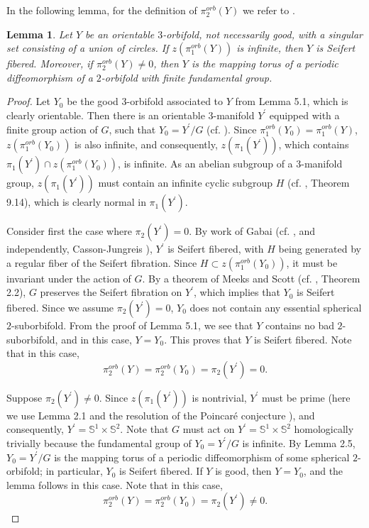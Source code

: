 \documentclass[11pt]{amsart}
\theoremstyle{plain}
\numberwithin{theorem}{section}
\newtheorem{lemma}[theorem]{Lemma}
\theoremstyle{definition}
\begin{document}
In the following lemma, for the definition of $\pi_2^{orb}(Y)$ we refer to \cite{Hae1, Hae2, C0}.

\begin{lemma}
Let $Y$ be an orientable $3$-orbifold, not necessarily good, with a singular set
consisting of a union of circles. If $z(\pi_1^{orb}(Y))$ is infinite, then $Y$ is Seifert fibered.
Moreover, if $\pi_2^{orb}(Y)\neq 0$, then $Y$ is the mapping torus of a periodic diffeomorphism 
of a $2$-orbifold with finite fundamental group.
\end{lemma}

\begin{proof}
Let $Y_0$ be the good $3$-orbifold associated to $Y$ from Lemma 5.1, which is clearly
orientable. Then there is an orientable $3$-manifold $Y^\prime$ equipped with a finite group action 
of $G$, such that $Y_0=Y^\prime/G$ (cf. \cite{BLP, MM}). Since $\pi_1^{orb}(Y_0)=\pi_1^{orb}(Y)$, 
$z(\pi_1^{orb}(Y_0))$ is also infinite, and consequently, $z(\pi_1(Y^\prime))$,
which contains $\pi_1(Y^\prime)\cap z(\pi_1^{orb}(Y_0))$, is infinite. 
As an abelian subgroup of a $3$-manifold group, $z(\pi_1(Y^\prime))$ must contain 
an infinite cyclic subgroup $H$ (cf. \cite{Hem}, Theorem 9.14), which is clearly normal 
in $\pi_1(Y^\prime)$. 

Consider first the case where $\pi_2(Y^\prime)=0$. By work of Gabai (cf. \cite{Gabai}, and independently, Casson-Jungreis \cite{CJ}), $Y^\prime$ is Seifert fibered, with $H$ 
being generated by a regular fiber of the Seifert fibration. Since $H\subset z(\pi_1^{orb}(Y_0))$, 
it must be invariant under the action of $G$. By a theorem of Meeks and Scott (cf. \cite{MS}, 
Theorem 2.2), $G$ preserves the Seifert fibration on $Y^\prime$, which implies
that $Y_0$ is Seifert fibered. Since we assume $\pi_2(Y^\prime)=0$, $Y_0$ does not contain
any essential spherical $2$-suborbifold. From the proof of Lemma 5.1, we see that $Y$ contains
no bad $2$-suborbifold, and in this case, $Y=Y_0$. This proves that $Y$ is Seifert fibered.
Note that in this case, 
$$
\pi_2^{orb}(Y)=\pi_2^{orb}(Y_0)=\pi_2(Y^\prime)=0.
$$

Suppose $\pi_2(Y^\prime)\neq 0$. Since $z(\pi_1(Y^\prime))$ is nontrivial, $Y^\prime$ must be
prime (here we use Lemma 2.1 and the resolution of the Poincar\'{e} conjecture \cite{P}), and consequently, $Y^\prime={{\mathbb S}}^1\times {{\mathbb S}}^2$. Note that $G$ must act on $Y^\prime={{\mathbb S}}^1\times{{\mathbb S}}^2$ homologically trivially because the fundamental group of $Y_0=Y^\prime/G$ is infinite. 
By Lemma 2.5, $Y_0=Y^\prime/G$ is the mapping torus of a periodic diffeomorphism of some
spherical $2$-orbifold; in particular, $Y_0$ is Seifert fibered. If $Y$ is good, then 
$Y=Y_0$, and the lemma follows in this case. Note that in this case,
$$
\pi_2^{orb}(Y)=\pi_2^{orb}(Y_0)=\pi_2(Y^\prime)\neq 0.
$$


\end{proof}
\end{document}
